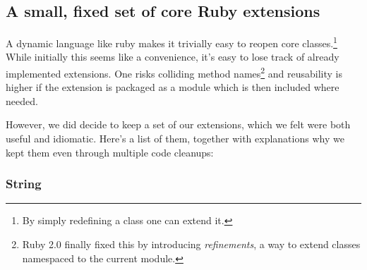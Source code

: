 \subsection{A small, fixed set of core Ruby extensions}

A dynamic language like ruby makes it trivially easy to reopen core classes.\footnote{By simply redefining a class one can extend it.} While initially this seems like a convenience, it's easy to lose track of already implemented extensions. One risks colliding method names\footnote{Ruby 2.0 finally fixed this by introducing \emph{refinements}, a way to extend classes namespaced to the current module.} and reusability is higher if the extension is packaged as a module which is then included where needed.

However, we did decide to keep a set of our extensions, which we felt were both useful and idiomatic. Here's a list of them, together with explanations why we kept them even through multiple code cleanups:

\subsubsection{String}

